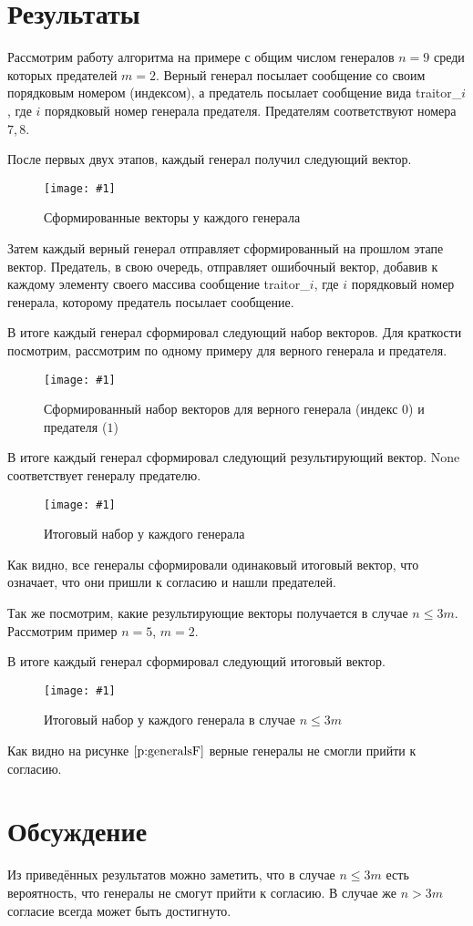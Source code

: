 \documentclass[a4paper,12pt]{article}
\newcommand{\plot}[4]{
    \begin{figure}[H]
        \begin{center}
            \texttt{[image: \#1]}
            \caption{#2}
            \label{#3}
        \end{center}
    \end{figure}
}
\begin{document}
    \section{Результаты}
    Рассмотрим работу алгоритма на примере с общим числом генералов $ n = 9 $ среди которых предателей $ m = 2 $.
    Верный генерал посылает сообщение со своим порядковым номером (индексом),
    а предатель посылает сообщение вида traitor\_$ i $, где $ i $ порядковый номер генерала предателя.
    Предателям соответствуют номера $ 7, 8 $.

    После первых двух этапов, каждый генерал получил следующий вектор.
    \plot{generals1}{Сформированные векторы у каждого генерала}{p:generals1}{1.0}

    Затем каждый верный генерал отправляет сформированный на прошлом этапе вектор.
    Предатель, в свою очередь, отправляет ошибочный вектор,
    добавив к каждому элементу своего массива сообщение traitor\_$ i $,
    где $ i $ порядковый номер генерала, которому предатель посылает сообщение.

    В итоге каждый генерал сформировал следующий набор векторов.
    Для краткости посмотрим, рассмотрим по одному примеру для верного генерала и предателя. 
    \plot{generals2}{Сформированный набор векторов для верного генерала (индекс $ 0 $) и предателя ($ 1 $)}{p:generals2}{0.5}

    В итоге каждый генерал сформировал следующий результирующий вектор.
    None соответствует генералу предателю.
    \plot{generals3}{Итоговый набор у каждого генерала}{p:generals3}{1.0}
 
    Как видно, все генералы сформировали одинаковый итоговый вектор, что означает, что они пришли к согласию и нашли предателей.

    Так же посмотрим, какие результирующие векторы получается в случае $ n \leq 3m $.
    Рассмотрим пример $ n = 5 $, $ m = 2 $.

    В итоге каждый генерал сформировал следующий итоговый вектор.
    \plot{generalsF}{Итоговый набор у каждого генерала в случае $ n \leq 3m $}{p:generalsF}{1.0}

    Как видно на рисунке $ \ref{p:generalsF} $ верные генералы не смогли прийти к согласию.

    \section{Обсуждение}
    Из приведённых результатов можно заметить, что в случае $ n \leq 3m $ есть вероятность,
    что генералы не смогут прийти к согласию. В случае же $ n > 3m $ согласие всегда может быть достигнуто.
\end{document}

